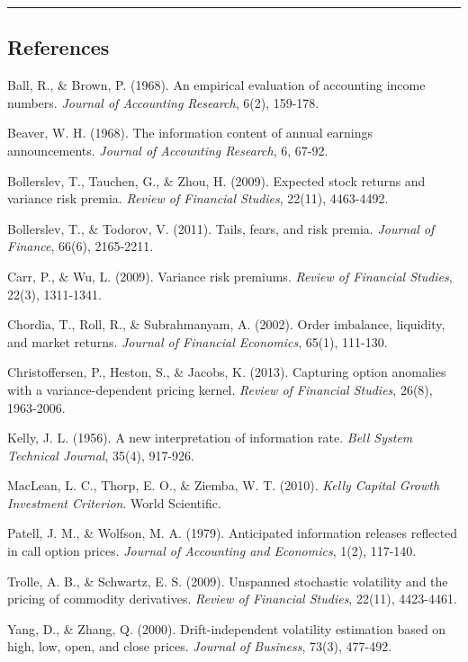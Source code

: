 \documentclass[
  american,
  11pt,
  11pt,
  letterpaper,
  onecolumn]{article}
\begin{document}
\begin{center}\rule{0.5\linewidth}{0.5pt}\end{center}

\subsection{References}\label{references}

Ball, R., \& Brown, P. (1968). An empirical evaluation of accounting
income numbers. \emph{Journal of Accounting Research}, 6(2), 159-178.

Beaver, W. H. (1968). The information content of annual earnings
announcements. \emph{Journal of Accounting Research}, 6, 67-92.

Bollerslev, T., Tauchen, G., \& Zhou, H. (2009). Expected stock returns
and variance risk premia. \emph{Review of Financial Studies}, 22(11),
4463-4492.

Bollerslev, T., \& Todorov, V. (2011). Tails, fears, and risk premia.
\emph{Journal of Finance}, 66(6), 2165-2211.

Carr, P., \& Wu, L. (2009). Variance risk premiums. \emph{Review of
Financial Studies}, 22(3), 1311-1341.

Chordia, T., Roll, R., \& Subrahmanyam, A. (2002). Order imbalance,
liquidity, and market returns. \emph{Journal of Financial Economics},
65(1), 111-130.

Christoffersen, P., Heston, S., \& Jacobs, K. (2013). Capturing option
anomalies with a variance-dependent pricing kernel. \emph{Review of
Financial Studies}, 26(8), 1963-2006.

Kelly, J. L. (1956). A new interpretation of information rate.
\emph{Bell System Technical Journal}, 35(4), 917-926.

MacLean, L. C., Thorp, E. O., \& Ziemba, W. T. (2010). \emph{Kelly
Capital Growth Investment Criterion}. World Scientific.

Patell, J. M., \& Wolfson, M. A. (1979). Anticipated information
releases reflected in call option prices. \emph{Journal of Accounting
and Economics}, 1(2), 117-140.

Trolle, A. B., \& Schwartz, E. S. (2009). Unspanned stochastic
volatility and the pricing of commodity derivatives. \emph{Review of
Financial Studies}, 22(11), 4423-4461.

Yang, D., \& Zhang, Q. (2000). Drift-independent volatility estimation
based on high, low, open, and close prices. \emph{Journal of Business},
73(3), 477-492.
\end{document}
